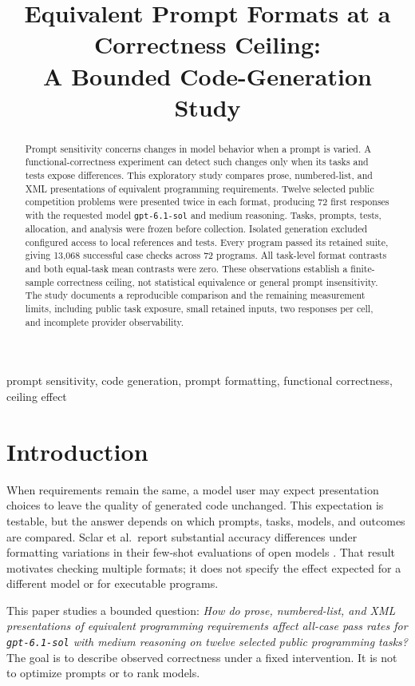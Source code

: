\documentclass[conference,a4paper]{IEEEtran}
\title{Equivalent Prompt Formats at a Correctness Ceiling:\\A Bounded Code-Generation Study}
\author{\IEEEauthorblockN{Altan Esmer}
\IEEEauthorblockA{Scientific Methods course project\\
Preliminary draft for author review, 23 October 2026}}
\newcommand{\evidencecite}[3]{\cite[#3]{#2}}
\newcommand{\model}{\texttt{gpt-6.1-sol}}
\begin{document}
\maketitle

\begin{abstract}
Prompt sensitivity concerns changes in model behavior when a prompt is varied. A functional-correctness experiment can detect such changes only when its tasks and tests expose differences. This exploratory study compares prose, numbered-list, and XML presentations of equivalent programming requirements. Twelve selected public competition problems were presented twice in each format, producing 72 first responses with the requested model \model{} and medium reasoning. Tasks, prompts, tests, allocation, and analysis were frozen before collection. Isolated generation excluded configured access to local references and tests. Every program passed its retained suite, giving 13,068 successful case checks across 72 programs. All task-level format contrasts and both equal-task mean contrasts were zero. These observations establish a finite-sample correctness ceiling, not statistical equivalence or general prompt insensitivity. The study documents a reproducible comparison and the remaining measurement limits, including public task exposure, small retained inputs, two responses per cell, and incomplete provider observability.
\end{abstract}

\begin{IEEEkeywords}
prompt sensitivity, code generation, prompt formatting, functional correctness, ceiling effect
\end{IEEEkeywords}

\section{Introduction}
When requirements remain the same, a model user may expect presentation choices to leave the quality of generated code unchanged. This expectation is testable, but the answer depends on which prompts, tasks, models, and outcomes are compared. Sclar et al.\ report substantial accuracy differences under formatting variations in their few-shot evaluations of open models \evidencecite{C01}{ICLR2024_6c0e99d7}{p.~1}. That result motivates checking multiple formats; it does not specify the effect expected for a different model or for executable programs.

This paper studies a bounded question: \emph{How do prose, numbered-list, and XML presentations of equivalent programming requirements affect all-case pass rates for \model{} with medium reasoning on twelve selected public programming tasks?} The goal is to describe observed correctness under a fixed intervention. It is not to optimize prompts or to rank models.
\end{document}
